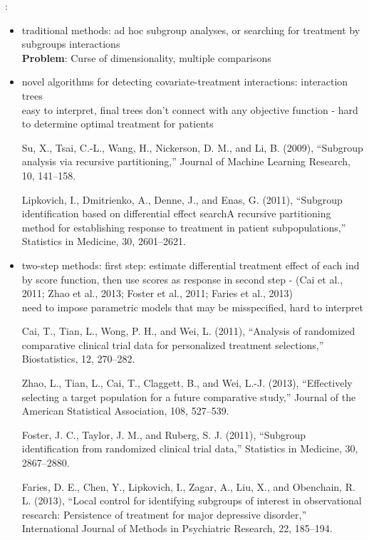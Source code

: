 \documentclass[12pt]{article}
\begin{document}
:
\begin{itemize}
  \item traditional methods: ad hoc subgroup analyses, or searching for treatment by subgroups interactions \\
    \textbf{Problem}: Curse of dimensionality, multiple comparisons
  \item novel algorithms for detecting covariate-treatment interactions: interaction trees \\
  easy to interpret, final trees don't connect with any objective function - hard to determine optimal treatment for patients
  
  Su, X., Tsai, C.-L., Wang, H., Nickerson, D. M., and Li, B. (2009), “Subgroup analysis via recursive partitioning,” Journal of Machine Learning Research, 10, 141–158.
  
  Lipkovich, I., Dmitrienko, A., Denne, J., and Enas, G. (2011), “Subgroup identification based on differential effect searchA recursive partitioning method for establishing response to treatment in patient subpopulations,” Statistics in Medicine, 30, 2601–2621.
  
  \item two-step methods: first step: estimate differential treatment effect of each ind by score function, then use scores as response in second step - (Cai et al., 2011; Zhao et al., 2013; Foster et al., 2011; Faries et al., 2013) \\
  need to impose parametric models that may be misspecified, hard to interpret
  
  Cai, T., Tian, L., Wong, P. H., and Wei, L. (2011), “Analysis of randomized comparative clinical trial data for personalized treatment selections,” Biostatistics, 12, 270–282.
  
  Zhao, L., Tian, L., Cai, T., Claggett, B., and Wei, L.-J. (2013), “Effectively selecting a target population for a future comparative study,” Journal of the American Statistical Association, 108, 527–539.
  
  Foster, J. C., Taylor, J. M., and Ruberg, S. J. (2011), “Subgroup identification from randomized clinical trial data,” Statistics in Medicine, 30, 2867–2880.
  
  Faries, D. E., Chen, Y., Lipkovich, I., Zagar, A., Liu, X., and Obenchain, R. L. (2013), “Local control for identifying subgroups of interest in observational research: Persistence of treatment for major depressive disorder,” International Journal of Methods in Psychiatric Research, 22, 185–194.
  

\end{itemize}
\end{document}
